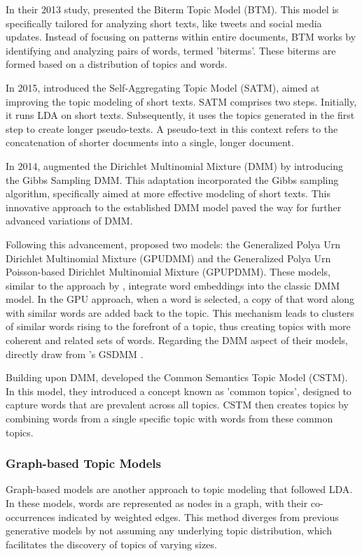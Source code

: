 \documentclass{article}
\begin{document}
In their 2013 study, \citet{yan_biterm_2013} presented the Biterm Topic Model (BTM). This model is specifically tailored for analyzing short texts, like tweets and social media updates. Instead of focusing on patterns within entire documents, BTM works by identifying and analyzing pairs of words, termed 'biterms'. These biterms are formed based on a distribution of topics and words.

In 2015, \citet{quan_short_2015} introduced the Self-Aggregating Topic Model (SATM), aimed at improving the topic modeling of short texts. SATM comprises two steps. Initially, it runs LDA on short texts. Subsequently, it uses the topics generated in the first step to create longer pseudo-texts. A pseudo-text in this context refers to the concatenation of shorter documents into a single, longer document.

In 2014, \citet{yin_dirichlet_2014} augmented the Dirichlet Multinomial Mixture (DMM) by introducing the Gibbs Sampling DMM. This adaptation incorporated the Gibbs sampling algorithm, specifically aimed at more effective modeling of short texts. This innovative approach to the established DMM model paved the way for further advanced variations of DMM.

Following this advancement, \citet{li_topic_2016} proposed two models: the Generalized Polya Urn Dirichlet Multinomial Mixture (GPUDMM) and the Generalized Polya Urn Poisson-based Dirichlet Multinomial Mixture (GPUPDMM). These models, similar to the approach by \citet{nguyen_improving_2015}, integrate word embeddings into the classic DMM model. In the GPU approach, when a word is selected, a copy of that word along with similar words are added back to the topic. This mechanism leads to clusters of similar words rising to the forefront of a topic, thus creating topics with more coherent and related sets of words. Regarding the DMM aspect of their models, \citeauthor{li_topic_2016} directly draw from \cite{yin_dirichlet_2014}'s GSDMM \citeauthor{yin_dirichlet_2014}.

Building upon DMM, \citet{li_filtering_2018} developed the Common Semantics Topic Model (CSTM). In this model, they introduced a concept known as 'common topics', designed to capture words that are prevalent across all topics. CSTM then creates topics by combining words from a single specific topic with words from these common topics.

\subsubsection{Graph-based Topic Models}
Graph-based models are another approach to topic modeling that followed LDA. In these models, words are represented as nodes in a graph, with their co-occurrences indicated by weighted edges. This method diverges from previous generative models by not assuming any underlying topic distribution, which facilitates the discovery of topics of varying sizes.
\end{document}
